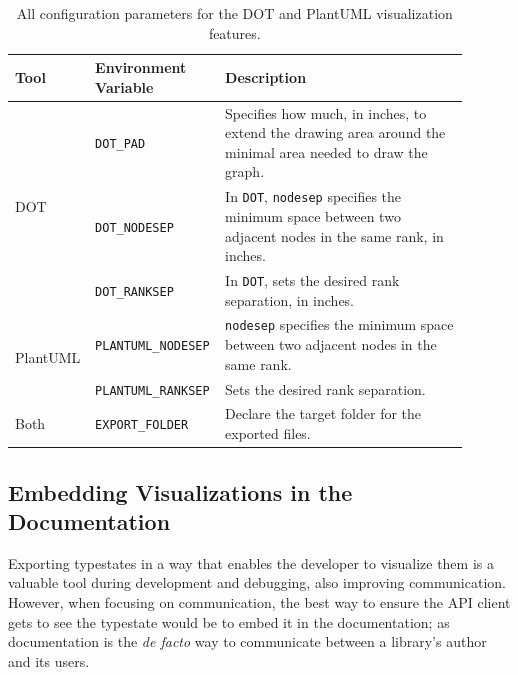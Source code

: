 \begin{table}[]
    \centering
    \begin{tabular}{p{0.12\linewidth}|p{0.25\linewidth}|p{0.53\linewidth}}
        Tool                      & Environment Variable       & Description                                                                                                           \\ \hline
        \multirow{3}{*}{DOT}      & \texttt{DOT\_PAD}          & Specifies how much, in inches, to extend the drawing area around the minimal area needed to draw the graph.           \\ \cline{2-3}
                                  & \texttt{DOT\_NODESEP}      & In \texttt{DOT}, \texttt{nodesep} specifies the minimum space between two adjacent nodes in the same rank, in inches. \\ \cline{2-3}
                                  & \texttt{DOT\_RANKSEP}      & In \texttt{DOT}, sets the desired rank separation, in inches.                                                         \\ \hline
        \multirow{2}{*}{PlantUML} & \texttt{PLANTUML\_NODESEP} & \texttt{nodesep} specifies the minimum space between two adjacent nodes in the same rank.                             \\ \cline{2-3}
                                  & \texttt{PLANTUML\_RANKSEP} & Sets the desired rank separation.                                                                                     \\ \hline
        Both                      & \texttt{EXPORT\_FOLDER}    & Declare the target folder for the exported files.
    \end{tabular}
    \caption{All configuration parameters for the DOT and PlantUML visualization features.}
    \label{tab:export-env-vars}
\end{table}

\subsection{Embedding Visualizations in the Documentation}\label{sec:automata-visualization:documentation-generation}

Exporting typestates in a way that enables the developer to visualize them is a valuable tool during development and debugging, also improving communication.
However, when focusing on communication, the best way to ensure the \gls{API} client gets to see the typestate would be to embed it in the documentation;
as documentation is the \emph{de facto} way to communicate between a library's author and its users.

